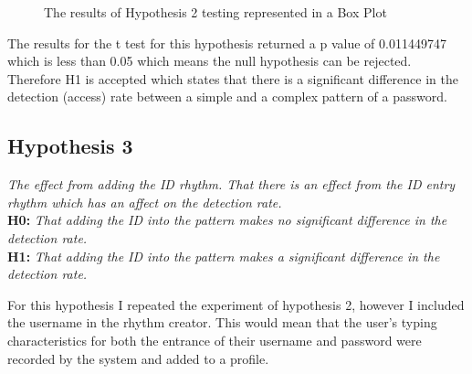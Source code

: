\documentclass{article}
\begin{document}
\begin{figure} [H]
    \centering
    \caption{The results of Hypothesis 2 testing represented in a Box Plot}
    \label{fig:boxPlotHyp2}
\end{figure}

The results for the t test for this hypothesis returned a p value of 0.011449747 which is less than 0.05 which means the null hypothesis can be rejected. Therefore H1 is accepted which states that	there	is a significant difference in	the	detection (access)	rate	between	a	simple	and	a	complex	pattern	of	a password.

\subsection{Hypothesis 3}
\begin{center}
\textit{The	effect	from	adding	the	ID	rhythm. That there is an effect from the ID entry rhythm which has an affect on the detection rate.} \newline \\

\textbf{H0:} \textit{That adding the ID	into the pattern makes no significant difference in the detection rate.} \newline \\
\textbf{H1:} \textit{That adding the ID	into the pattern makes a significant	difference in the detection	rate.} \newline \\
\end{center}

For this hypothesis I repeated the experiment of hypothesis 2, however I included the username in the rhythm creator. This would mean that the user's typing characteristics for both the entrance of their username and password were recorded by the system and added to a profile.  
\end{document}
